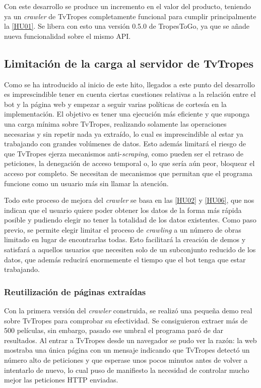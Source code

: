 Con este desarrollo se produce un incremento en el valor del producto, teniendo
ya un \textit{crawler} de TvTropes completamente funcional para cumplir
principalmente la
\href{https://github.com/jlgallego99/TropesToGo/issues/6}{[HU01]}. Se libera con
esto una versión 0.5.0 de TropesToGo, ya que se añade nueva funcionalidad sobre
el mismo API.

\subsection{Limitación de la carga al servidor de TvTropes}
Como se ha introducido al inicio de este hito, llegados a este punto del
desarrollo es imprescindible tener en cuenta ciertas cuestiones relativas a la
relación entre el bot y la página web y empezar a seguir varias políticas de
cortesía en la implementación. El objetivo es tener una ejecución más eficiente
y que suponga una carga mínima sobre TvTropes, realizando solamente las
operaciones necesarias y sin repetir nada ya extraído, lo cual es imprescindible
al estar ya trabajando con grandes volúmenes de datos. Esto además limitará el
riesgo de que TvTropes ejerza mecanismos anti-\textit{scraping}, como pueden ser
el retraso de peticiones, la denegación de acceso temporal o, lo que sería aún
peor, bloquear el acceso por completo. Se necesitan de mecanismos que permitan
que el programa funcione como un usuario más sin llamar la atención.

Todo este proceso de mejora del \textit{crawler} se basa en las
\href{https://github.com/jlgallego99/TropesToGo/issues/7}{[HU02]} y
\href{https://github.com/jlgallego99/TropesToGo/issues/45}{[HU06]}, que nos
indican que el usuario quiere poder obtener los datos de la forma más rápida
posible y pudiendo elegir no tener la totalidad de los datos existentes. Como
paso previo, se permite elegir limitar el proceso de \textit{crawling} a un
número de obras limitado en lugar de encontrarlas todas. Esto facilitará la
creación de demos y satisfará a aquellos usuarios que necesiten solo de un
subconjunto reducido de los datos, que además reducirá enormemente el tiempo que
el bot tenga que estar trabajando.

\subsubsection{Reutilización de páginas extraídas}
Con la primera versión del \textit{crawler} construida, se realizó una pequeña
demo real sobre TvTropes para comprobar su efectividad. Se consiguieron extraer
más de 500 películas, sin embargo, pasado ese umbral el programa paró de dar
resultados. Al entrar a TvTropes desde un navegador se pudo ver la razón: la web
mostraba una única página con un mensaje indicando que TvTropes detectó un
número alto de peticiones y que esperase unos pocos minutos antes de volver a
intentarlo de nuevo, lo cual puso de manifiesto la necesidad de controlar mucho
mejor las peticiones HTTP enviadas.

